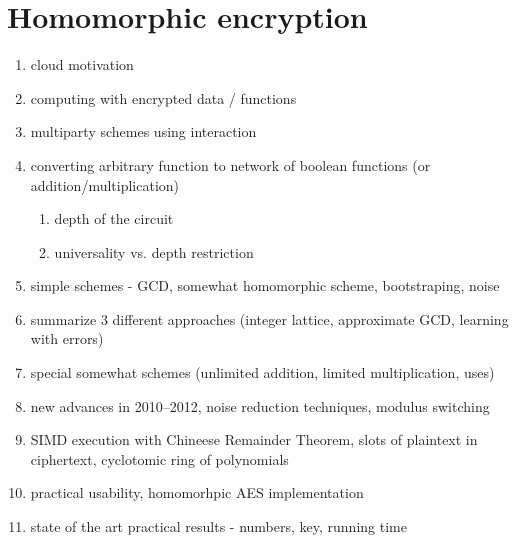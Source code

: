 \documentclass[11pt,oneside,final]{fithesis2}
\begin{document}
\section{Homomorphic encryption}
    \begin{enumerate}
     \item cloud motivation
     \item computing with encrypted data / functions
     \item multiparty schemes using interaction
     \item converting arbitrary function to network of boolean functions (or addition/multiplication)
	\begin{enumerate}
	 \item depth of the circuit
	 \item universality vs. depth restriction
	\end{enumerate}
    
%
    
    
     \item simple schemes - GCD, somewhat homomorphic scheme, bootstraping, noise
     \item summarize 3 different approaches (integer lattice, approximate GCD, learning with errors)
     \item special somewhat schemes (unlimited addition, limited multiplication, uses)
     \item new advances in 2010--2012, noise reduction techniques, modulus switching
     \item SIMD execution with Chineese Remainder Theorem, slots of plaintext in ciphertext, cyclotomic ring of polynomials
     \item practical usability, homomorhpic AES implementation
     \item state of the art practical results - numbers, key, running time
    \end{enumerate}
\end{document}

